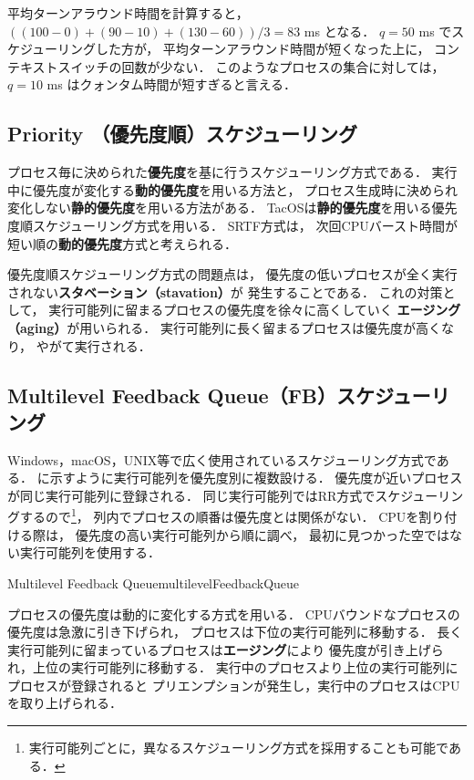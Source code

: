 平均ターンアラウンド時間を計算すると，
$((100-0)+(90-10)+(130-60))/3=83$ ms となる．
$q = 50$ ms でスケジューリングした方が，
平均ターンアラウンド時間が短くなった上に，
コンテキストスイッチの回数が少ない．
このようなプロセスの集合に対しては，
$q = 10$ ms はクォンタム時間が短すぎると言える．

\subsection{Priority （優先度順）スケジューリング}
プロセス毎に決められた{\bf 優先度}を基に行うスケジューリング方式である．
実行中に優先度が変化する{\bf 動的優先度}を用いる方法と，
プロセス生成時に決められ変化しない{\bf 静的優先度}を用いる方法がある．
TacOSは{\bf 静的優先度}を用いる優先度順スケジューリング方式を用いる．
SRTF方式は，
次回CPUバースト時間が短い順の{\bf 動的優先度}方式と考えられる．

優先度順スケジューリング方式の問題点は，
優先度の低いプロセスが全く実行されない{\bf スタベーション（stavation）}が
発生することである．
これの対策として，
実行可能列に留まるプロセスの優先度を徐々に高くしていく
{\bf エージング（aging）}が用いられる．
実行可能列に長く留まるプロセスは優先度が高くなり，
やがて実行される．

\subsection{Multilevel Feedback Queue（FB）スケジューリング}
Windows，macOS，UNIX等で広く使用されているスケジューリング方式である．
に示すように実行可能列を優先度別に複数設ける．
優先度が近いプロセスが同じ実行可能列に登録される．
同じ実行可能列ではRR方式でスケジューリングするので\footnote{
実行可能列ごとに，異なるスケジューリング方式を採用することも可能である．
}，
列内でプロセスの順番は優先度とは関係がない．
CPUを割り付ける際は，
優先度の高い実行可能列から順に調べ，
最初に見つかった空ではない実行可能列を使用する．

{Multilevel Feedback Queue}{multilevelFeedbackQueue}

プロセスの優先度は動的に変化する方式を用いる．
CPUバウンドなプロセスの優先度は急激に引き下げられ，
プロセスは下位の実行可能列に移動する．
長く実行可能列に留まっているプロセスは{\bf エージング}により
優先度が引き上げられ，上位の実行可能列に移動する．
実行中のプロセスより上位の実行可能列にプロセスが登録されると
プリエンプションが発生し，実行中のプロセスはCPUを取り上げられる．


